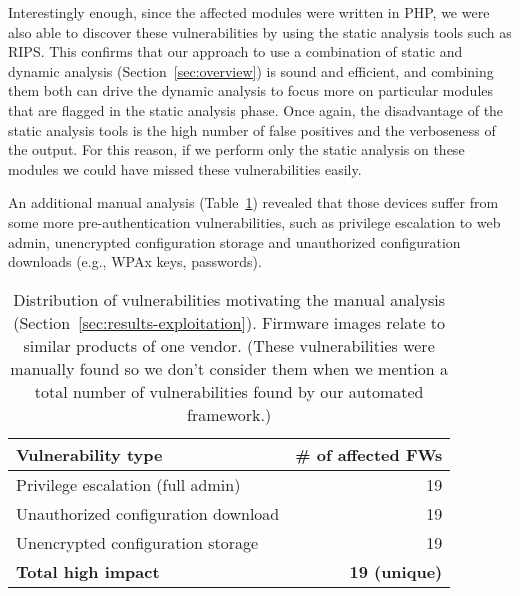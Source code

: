 \documentclass[conference]{./templates/ndss/IEEEtran}
\newcounter{t0d0_counter}
\newcounter{pr00f_counter}
\newcommand{\countfirmwaremanualfwtotal}{19}
\newcommand{\countfirmwaremanualfwprivesc}{19}
\newcommand{\countfirmwaremanualfwunauthconfdown}{19}
\newcommand{\countfirmwaremanualfwunencryptconf}{19}
\begin{document}
Interestingly enough, since the affected modules were written in PHP, 
we were also able to discover these vulnerabilities by using the static 
analysis tools such as RIPS. This confirms that our approach 
to use a combination of static and dynamic analysis (Section~\ref{sec:overview}) is 
sound and efficient, and combining them both can drive the dynamic analysis to focus more 
on particular modules that are flagged in the static analysis phase. 
Once again, the disadvantage of the static analysis tools is the high number 
of false positives and the verboseness of the output. For this reason, 
if we perform only the static analysis on these modules we could have missed 
these vulnerabilities easily. 

An additional manual analysis (Table~\ref{tbl:vulns-manual}) revealed
that those devices suffer from some more pre-authentication
vulnerabilities, such as privilege escalation to web admin,
unencrypted configuration storage and unauthorized configuration
downloads (e.g., WPAx keys, passwords).


\begin{table}[t]
\centering
\caption{Distribution of vulnerabilities motivating the manual
  analysis (Section~\ref{sec:results-exploitation}). Firmware
  images relate to similar products of one vendor. 
  (These vulnerabilities were manually found so we don't 
  consider them when we mention a total number of vulnerabilities 
  found by our automated framework.) 
}
\begin{tabular}{lr}
\\
\toprule
\textbf{Vulnerability type} & \textbf{\# of affected FWs} \\
\midrule

Privilege escalation (full admin)     &   \countfirmwaremanualfwprivesc   \\
Unauthorized configuration download   &   \countfirmwaremanualfwunauthconfdown    \\
Unencrypted configuration storage    &   \countfirmwaremanualfwunencryptconf \\

\midrule
\textbf{Total high impact}          &   \textbf{\countfirmwaremanualfwtotal{} (unique)}    \\
\bottomrule


\end{tabular}
\label{tbl:vulns-manual}
\end{table}
\end{document}

